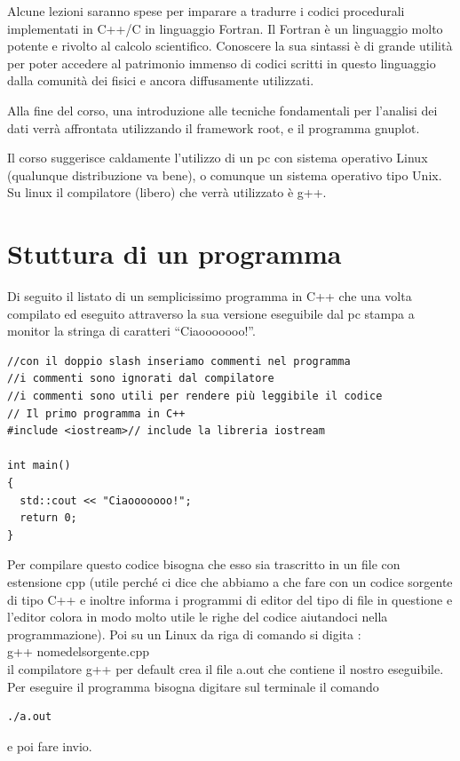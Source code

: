 \documentclass[11pt,fleqn]{book} %
\begin{document}
Alcune lezioni saranno spese per imparare a tradurre i codici procedurali implementati in C++/C in linguaggio Fortran. Il Fortran
è un linguaggio molto potente e rivolto al calcolo scientifico. Conoscere la sua sintassi è di grande utilità per poter accedere al patrimonio immenso di codici scritti in questo linguaggio dalla comunità dei fisici e ancora diffusamente utilizzati.

Alla fine del corso, una introduzione alle tecniche fondamentali per l'analisi dei dati verrà affrontata utilizzando il framework root, e il programma gnuplot.


Il corso suggerisce caldamente l'utilizzo di un pc con sistema operativo Linux (qualunque distribuzione va bene), o comunque un sistema operativo tipo Unix. Su linux il compilatore (libero) che verrà utilizzato è g++.

\section{Stuttura di un programma}

Di seguito il listato di un semplicissimo programma in C++
che una volta compilato ed eseguito attraverso la sua versione
eseguibile dal pc stampa a monitor la stringa di caratteri ``Ciaooooooo!''.

\begin{verbatim}
//con il doppio slash inseriamo commenti nel programma
//i commenti sono ignorati dal compilatore
//i commenti sono utili per rendere più leggibile il codice
// Il primo programma in C++
#include <iostream>// include la libreria iostream

int main()
{
  std::cout << "Ciaooooooo!";
  return 0;
}
\end{verbatim}

Per compilare questo codice bisogna che esso sia trascritto in un file con estensione cpp (utile perché ci dice che abbiamo a che fare con un codice sorgente di tipo C++ e inoltre informa i programmi di editor del tipo di file in questione e l'editor colora in modo molto utile le righe del codice aiutandoci nella programmazione).
Poi su un Linux da riga di comando si digita :\\
g++ nomedelsorgente.cpp\\
il compilatore g++ per default crea il file a.out che contiene il nostro eseguibile. Per eseguire il programma bisogna digitare sul terminale il comando
 \begin{verbatim}
./a.out
\end{verbatim}
e poi fare invio.
\end{document}
